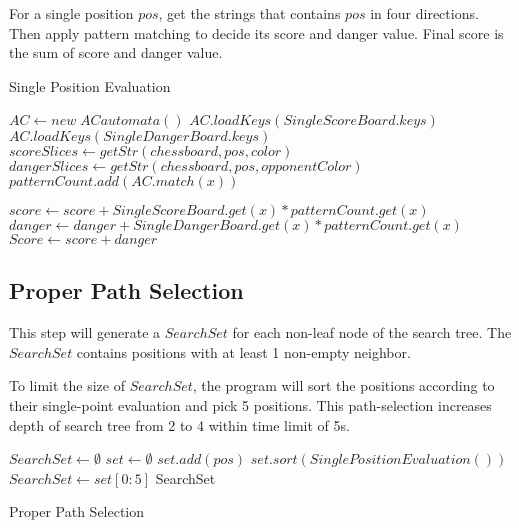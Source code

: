 \documentclass[conference]{IEEEtran}
\begin{document}
For a single position $pos$, get the strings that contains $pos$ in four directions. Then apply pattern matching to decide its score and danger value. Final score is the sum of score and danger value.
\begin{algorithm}
    \caption{Single Position Evaluation}
\begin{algorithmic}[1]
    \State $AC \gets new\; ACautomata()$
    \State $AC.loadKeys(SingleScoreBoard.keys)$
    \State $AC.loadKeys(SingleDangerBoard.keys)$
    \State $scoreSlices \gets getStr(chessboard, pos, color)$
    \State $dangerSlices \gets getStr(chessboard, pos, opponentColor)$
        \State $patternCount.add(AC.match(x))$
    \EndFor

        \State $score \gets score + SingleScoreBoard.get(x) * patternCount.get(x)$
        \Else
        \State $danger \gets danger + SingleDangerBoard.get(x) * patternCount.get(x)$
        \EndIf
    \EndFor
    \State $Score \gets score + danger$
\end{algorithmic}
\end{algorithm}

\subsection{Proper Path Selection}
This step will generate a $SearchSet$ for each non-leaf node of the search tree. The $SearchSet$ contains positions with at least 1 non-empty neighbor.

To limit the size of $SearchSet$, the program will sort the positions according to their single-point evaluation and pick 5 positions. This path-selection increases depth of search tree from 2 to 4 within time limit of 5s.
\begin{algorithm}
    \begin{algorithmic}
    \State $SearchSet \gets \emptyset$
    \State $set \gets \emptyset$
    \State $set.add(pos)$
    \EndIf
    \EndFor
    \State $set.sort(SinglePositionEvaluation())$
    \State $SearchSet \gets set[0:5]$
    \Return SearchSet
    \EndFunction
    \end{algorithmic}
    \caption{Proper Path Selection}
\end{algorithm}
\end{document}
